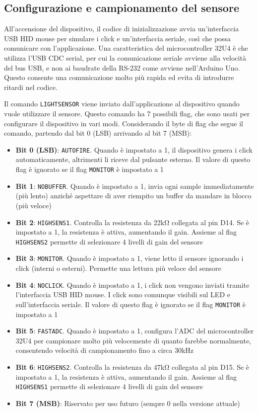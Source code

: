 \subsection{Configurazione e campionamento del sensore}
All'accensione del dispositivo, il codice di inizializzazione avvia un'interfaccia USB HID mouse per simulare i click e un'interfaccia seriale, così che possa comunicare con l'applicazione. Una caratteristica del microcontroller 32U4 è che utilizza l'USB CDC serial, per cui la comunicazione seriale avviene alla velocità del bus USB, e non ai baudrate della RS-232 come avviene nell'Arduino Uno. Questo consente una comunicazione molto più rapida ed evita di introdurre ritardi nel codice.

Il comando \texttt{LIGHTSENSOR} viene inviato dall'applicazione al dispositivo quando vuole utilizzare il sensore. Questo comando ha 7 possibili flag, che sono usati per configurare il dispositivo in vari modi. Considerando il byte di flag che segue il comando, partendo dal bit 0 (LSB) arrivando al bit 7 (MSB):
\begin{itemize}
	\item \textbf{Bit 0 (LSB)}: \texttt{AUTOFIRE}. Quando è impostato a 1, il dispositivo genera i click automaticamente, altrimenti li riceve dal pulsante esterno. Il valore di questo flag è ignorato se il flag \texttt{MONITOR} è impostato a 1
	\item \textbf{Bit 1}: \texttt{NOBUFFER}. Quando è impostato a 1, invia ogni sample immediatamente (più lento) anziché aspettare di aver riempito un buffer da mandare in blocco (più veloce)
	\item \textbf{Bit 2}: \texttt{HIGHSENS1}. Controlla la resistenza da 22k\si{\ohm} collegata al pin D14. Se è impostato a 1, la resistenza è attiva, aumentando il gain. Assieme al flag \texttt{HIGHSENS2} permette di selezionare 4 livelli di gain del sensore
	\item \textbf{Bit 3}: \texttt{MONITOR}. Quando è impostato a 1, viene letto il sensore ignorando i click (interni o esterni). Permette una lettura più veloce del sensore
	\item \textbf{Bit 4}: \texttt{NOCLICK}. Quando è impostato a 1, i click non vengono inviati tramite l'interfaccia USB HID mouse. I click sono comunque visibili sul LED e sull'interfaccia seriale. Il valore di questo flag è ignorato se il flag \texttt{MONITOR} è impostato a 1
	\item \textbf{Bit 5}: \texttt{FASTADC}. Quando è impostato a 1, configura l'ADC del microcontroller 32U4 per campionare molto più velocemente di quanto farebbe normalmente, consentendo velocità di campionamento fino a circa 30kHz
	\item \textbf{Bit 6}: \texttt{HIGHSENS2}. Controlla la resistenza da 47k\si{\ohm} collegata al pin D15. Se è impostato a 1, la resistenza è attiva, aumentando il gain. Assieme al flag \texttt{HIGHSENS1} permette di selezionare 4 livelli di gain del sensore
	\item \textbf{Bit 7 (MSB)}: Riservato per uso futuro (sempre 0 nella versione attuale)
\end{itemize}

